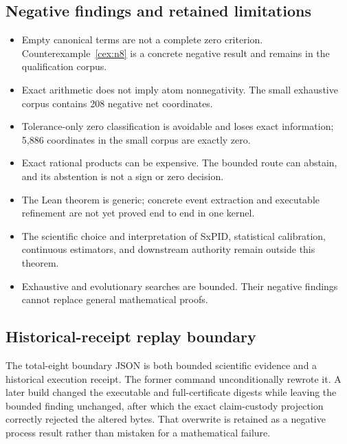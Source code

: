 \documentclass[11pt]{article}
\theoremstyle{definition}
\begin{document}
\subsection{Negative findings and retained limitations}
\begin{itemize}[leftmargin=*]
  \item Empty canonical terms are not a complete zero criterion.  Counterexample~\ref{cex:n8}
        is a concrete negative result and remains in the qualification corpus.
  \item Exact arithmetic does not imply atom nonnegativity.  The small exhaustive corpus contains
        208 negative net coordinates.
  \item Tolerance-only zero classification is avoidable and loses exact information; 5,886
        coordinates in the small corpus are exactly zero.
  \item Exact rational products can be expensive.  The bounded route can abstain, and its
        abstention is not a sign or zero decision.
  \item The Lean theorem is generic; concrete event extraction and executable refinement are not
        yet proved end to end in one kernel.
  \item The scientific choice and interpretation of SxPID, statistical calibration, continuous
        estimators, and downstream authority remain outside this theorem.
  \item Exhaustive and evolutionary searches are bounded.  Their negative findings cannot replace
        general mathematical proofs.
\end{itemize}

\subsection{Historical-receipt replay boundary}

The total-eight boundary JSON is both bounded scientific evidence and a historical execution
receipt.  The former command unconditionally rewrote it.  A later build changed the executable
and full-certificate digests while leaving the bounded finding unchanged, after which the exact
claim-custody projection correctly rejected the altered bytes.  That overwrite is retained as a
negative process result rather than mistaken for a mathematical failure.
\end{document}
